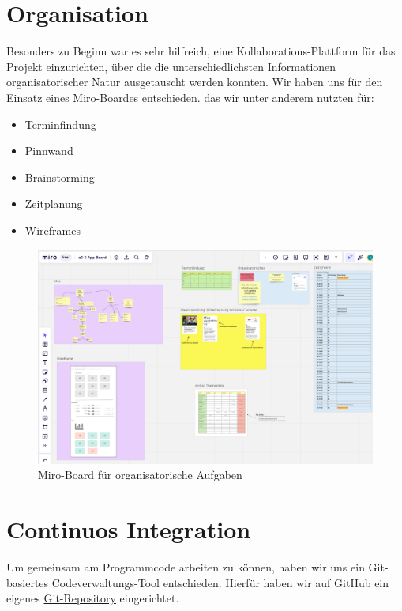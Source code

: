 \documentclass{article}
\begin{document}
\section{Organisation}

Besonders zu Beginn war es sehr hilfreich, eine Kollaborations-Plattform 
für das Projekt einzurichten, über die die unterschiedlichsten Informationen
organisatorischer Natur ausgetauscht werden konnten. 
Wir haben uns für den Einsatz eines Miro-Boardes entschieden. das wir 
unter anderem nutzten für:

\begin{itemize}
\item Terminfindung
\item Pinnwand
\item Brainstorming
\item Zeitplanung
\item Wireframes
\end{itemize}

\begin{figure}[h]
	\begin{center}
 	\includegraphics[scale=0.40]{../images/miro_board.png}
 	\caption{Miro-Board für organisatorische Aufgaben}
	\end{center}
\end{figure}

\section{Continuos Integration}

Um gemeinsam am Programmcode arbeiten zu können, haben wir uns ein Git-basiertes 
Codeverwaltungs-Tool entschieden. Hierfür haben wir auf GitHub ein eigenes
\href{https://github.com/jk-fhswf/pki-a22-app}{Git-Repository} eingerichtet.
\end{document}
